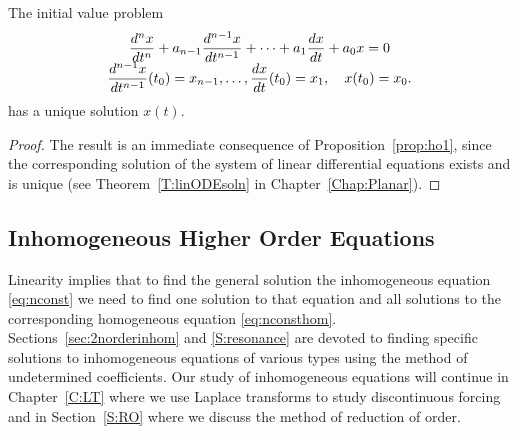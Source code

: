 \documentclass{ximera}
\begin{document}
\arraystart
\begin{theorem}
The initial value problem
\begin{equation}
\begin{array}{c}
\displaystyle \frac{d^nx}{dt^n} + a_{n-1}\frac{d^{n-1}x}{dt^{n-1}} +
\cdots + a_1\frac{dx}{dt}+a_0x = 0\\
\displaystyle \frac{d^{n-1}x}{dt^{n-1}}(t_0)=x_{n-1},\ldots,\frac{dx}{dt}(t_0)=x_1,\quad
x(t_0)=x_0.
\end{array}
\end{equation}
has a unique solution $x(t)$.
\end{theorem}
\arrayfinish

\begin{proof} The result is an immediate consequence of Proposition~\ref{prop:ho1},
since the corresponding solution of the system of linear differential
equations exists and is unique (see Theorem~\ref{T:linODEsoln} in 
Chapter~\ref{Chap:Planar}).
\end{proof}

\subsection*{Inhomogeneous Higher Order Equations}

Linearity implies that to find the 
general solution the inhomogeneous
equation \eqref{eq:nconst} we need to find one solution to that equation 
and all solutions to the corresponding homogeneous equation 
\eqref{eq:nconsthom}.  Sections~\ref{sec:2norderinhom} and \ref{S:resonance} 
are devoted to finding specific solutions to inhomogeneous equations of 
various types using the method of undetermined coefficients.  Our study of
inhomogeneous equations will continue in Chapter~\ref{C:LT} where we use 
Laplace transforms to study discontinuous forcing and in Section~\ref{S:RO}  
where we discuss the method of reduction of order.



\EXER

\TEXER
\end{document}
